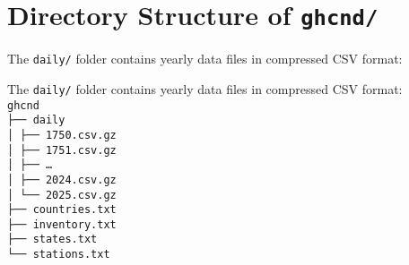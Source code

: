 \documentclass[11pt]{article}
\begin{document}
\bigskip

\section*{Directory Structure of \texttt{ghcnd/}}

The \texttt{daily/} folder contains yearly data files in compressed CSV format:

\bigskip
\noindent The \texttt{daily/} folder contains yearly data files in compressed CSV format:
\texttt{%
\\
ghcnd\\
├── daily\\
│   ├── 1750.csv.gz\\
│   ├── 1751.csv.gz\\
│   ├── \ldots\\
│   ├── 2024.csv.gz\\
│   └── 2025.csv.gz\\
├── countries.txt\\
├── inventory.txt\\
├── states.txt\\
└── stations.txt
}
\end{document}
